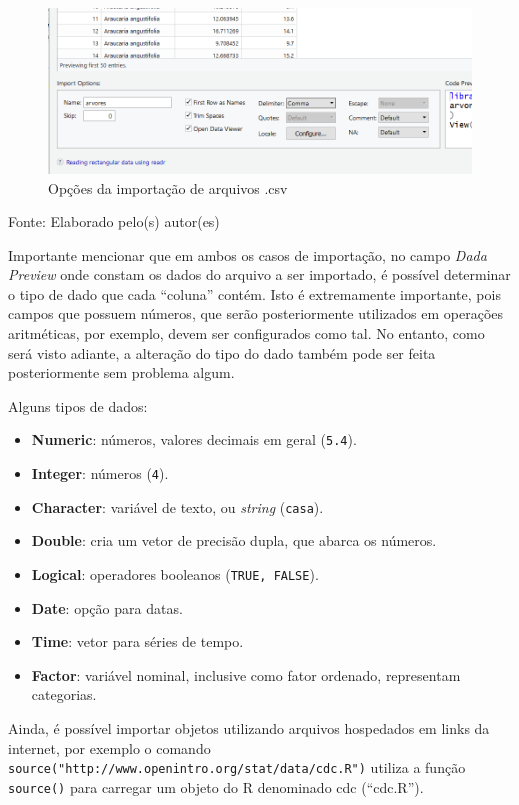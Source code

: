 \documentclass[12pt,portuguese,oneside]{book}
\providecommand{\tightlist}{%
  \setlength{\itemsep}{0pt}\setlength{\parskip}{0pt}}
\begin{document}
\begin{figure}[H]

{\centering \includegraphics[width=0.8\linewidth]{r4csv} 

}

\caption{Opções da importação de arquivos .csv}\label{fig:r4csv}
\end{figure}

Fonte: Elaborado pelo(s) autor(es)

Importante mencionar que em ambos os casos de importação, no campo
\emph{Dada Preview} onde constam os dados do arquivo a ser importado, é
possível determinar o tipo de dado que cada ``coluna'' contém. Isto é
extremamente importante, pois campos que possuem números, que serão
posteriormente utilizados em operações aritméticas, por exemplo, devem
ser configurados como tal. No entanto, como será visto adiante, a
alteração do tipo do dado também pode ser feita posteriormente sem
problema algum.

Alguns tipos de dados:

\begin{itemize}
\tightlist
\item
  \textbf{Numeric}: números, valores decimais em geral (\texttt{5.4}).
\item
  \textbf{Integer}: números (\texttt{4}).
\item
  \textbf{Character}: variável de texto, ou \emph{string}
  (\texttt{casa}).
\item
  \textbf{Double}: cria um vetor de precisão dupla, que abarca os
  números.
\item
  \textbf{Logical}: operadores booleanos (\texttt{TRUE,\ FALSE}).
\item
  \textbf{Date}: opção para datas.
\item
  \textbf{Time}: vetor para séries de tempo.
\item
  \textbf{Factor}: variável nominal, inclusive como fator ordenado,
  representam categorias.
\end{itemize}

Ainda, é possível importar objetos utilizando arquivos hospedados em
links da internet, por exemplo o comando
\texttt{source("http://www.openintro.org/stat/data/cdc.R")} utiliza a
função \texttt{source()} para carregar um objeto do R denominado cdc
(``cdc.R'').
\end{document}
